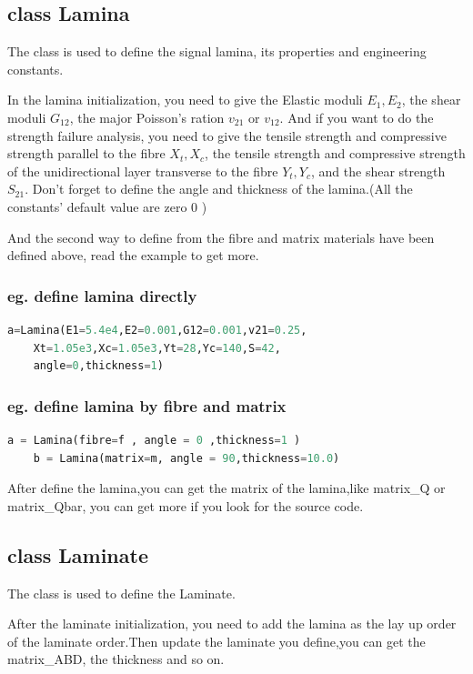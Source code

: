 \documentclass{article}
\begin{document}
	\subsection{class Lamina}
		The class is used to define the signal lamina, its properties and engineering constants.

		In the lamina initialization, you need to give the Elastic moduli $E_1,E_2$, the shear moduli $G_{12}$, the major Poisson's ration $v_{21}$ or $v_{12}$. And if you want to do the strength failure analysis, you need to give the tensile strength and compressive strength parallel to the fibre $X_t,X_c$, the tensile strength and compressive strength of the unidirectional layer transverse to the fibre $Y_t,Y_c$, and the shear strength $S_{21}$. Don't forget to define the angle and thickness of the lamina.(All the constants' default value are zero 0 )

		And the second way to define from the fibre and matrix materials have been defined above, read the example to get more.

		\subsubsection{eg. define lamina directly}	
		\begin{lstlisting}[language={Python}] 
	a=Lamina(E1=5.4e4,E2=0.001,G12=0.001,v21=0.25,
	Xt=1.05e3,Xc=1.05e3,Yt=28,Yc=140,S=42,
	angle=0,thickness=1)
		\end{lstlisting} 

		\subsubsection{eg. define lamina by fibre and matrix }
		\begin{lstlisting}[language={Python}] 
	a = Lamina(fibre=f , angle = 0 ,thickness=1 )
	b = Lamina(matrix=m, angle = 90,thickness=10.0)
		\end{lstlisting} 

		After define the lamina,you can get the matrix of the lamina,like matrix\_Q or matrix\_Qbar, you can get more if you look for the source code.
		

	\subsection{class Laminate}
		The class is used to define the Laminate.

		After the laminate initialization, you need to add the lamina as the lay up order of the laminate order.Then update the laminate you define,you can get the matrix\_ABD, the thickness and so on.
\end{document}
